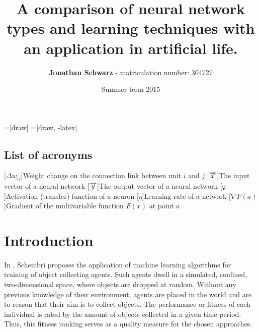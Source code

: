 \documentclass[10pt,a4paper,DIV=11]{scrreprt}
\title
{
     A comparison of neural network types and learning techniques with an application in artificial life.
}
\author
{
    \textbf{Jonathan Schwarz} - matriculation number: 304727
}
\date
{
    Summer term 2015
}
\begin{document}
=[draw]
=[draw, -latex] 


\maketitle
\thispagestyle{empty}
\newpage
{\large\tableofcontents}
\newpage

\thispagestyle{empty}

\section*{List of acronyms}
\begin{acronym}
    [$\Delta w_{ij}$]{Weight change  on the connection link between unit $i$ and $j$}
    [$\protect \overrightarrow{x}$]{The input vector of a neural network}
    [$\protect \overrightarrow{y}$]{The output vector of a neural network}
    [$\varphi$]{Activation (transfer) function of a neuron}
    [$\eta$]{Learning rate of a network}
    [$\nabla F(a)$]{Gradient of the multivariable function $F(x)$ at point $a$}
\end{acronym}

\newpage

\chapter{Introduction}
In \cite{DANIEL}, Schembri proposes the application of machine learning algorithms for training of object collecting agents. 
Such agents dwell in a simulated, confined, two-dimensional space, where objects are dropped at random. Without any previous knowledge of 
their environment, agents are placed in the world and are to reason that their aim is to collect objects. The performance or fitness of each 
individual is rated by the amount of objects collected in a given time period. Thus, this fitness ranking serves as a quality measure for the 
chosen approaches.
\end{document}

